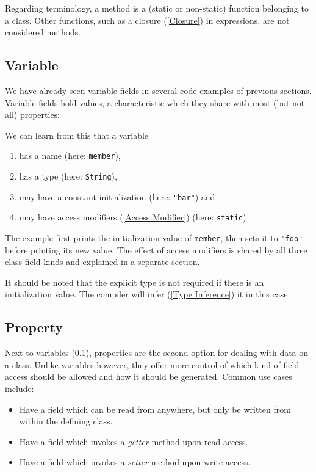\documentclass{article}
\newcommand{\type}[1]{\texttt{#1}}
\newcommand{\expr}[1]{\texttt{#1}}
\newcommand{\tref}[2]{#1 (\ref{#2})}
\begin{document}
Regarding terminology, a method is a (static or non-static) function belonging to a class. Other functions, such as a \tref{closure}{Closure} in expressions, are not considered methods.


\subsection{Variable}
\label{Variable}

We have already seen variable fields in several code examples of previous sections. Variable fields hold values, a characteristic which they share with most (but not all) properties:


We can learn from this that a variable

\begin{enumerate}
	\item has a name (here: \expr{member}),
	\item has a type (here: \type{String}),
	\item may have a constant initialization (here: \expr{"bar"}) and
	\item may have \tref{access modifiers}{Access Modifier} (here: \expr{static})
\end{enumerate}
The example first prints the initialization value of \expr{member}, then sets it to \expr{"foo"} before printing its new value. The effect of access modifiers is shared by all three class field kinds and explained in a separate section.

It should be noted that the explicit type is not required if there is an initialization value. The compiler will \tref{infer}{Type Inference} it in this case.




\subsection{Property}
\label{Property}

Next to \tref{variables}{Variable}, properties are the second option for dealing with data on a class. Unlike variables however, they offer more control of which kind of field access should be allowed and how it should be generated. Common use cases include:

\begin{itemize}
	\item Have a field which can be read from anywhere, but only be written from within the defining class.
	\item Have a field which invokes a \emph{getter}-method upon read-access.
	\item Have a field which invokes a \emph{setter}-method upon write-access.
\end{itemize}
\end{document}
